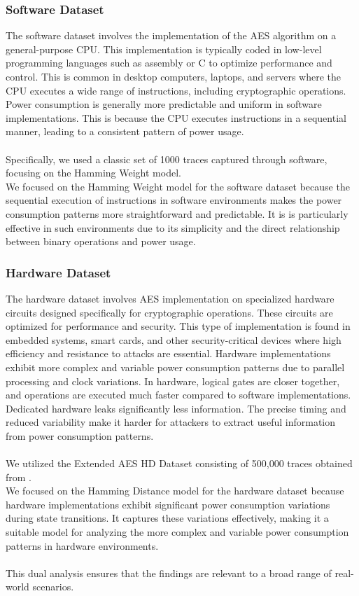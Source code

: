 \documentclass[a4paper,10pt]{article}
\begin{document}
\subsubsection{Software Dataset}
The software dataset involves the implementation of the AES algorithm on a general-purpose CPU.
This implementation is typically coded in low-level programming languages such as assembly or C to optimize performance and control.
This is common in desktop computers, laptops, and servers where the CPU executes a wide range of instructions, including cryptographic operations.
Power consumption is generally more predictable and uniform in software implementations. This is because the CPU executes instructions in a sequential manner, leading to a consistent pattern of power usage.
\\ \\
Specifically, we used a classic set of 1000 traces captured through software, focusing on the Hamming Weight model.\\
We focused on the Hamming Weight model for the software dataset because the sequential execution of instructions in software environments makes the power consumption patterns more straightforward and predictable.
It is is particularly effective in such environments due to its simplicity and the direct relationship between binary operations and power usage.
\subsubsection{Hardware Dataset}
The hardware dataset involves AES implementation on specialized hardware circuits designed specifically for cryptographic operations. 
These circuits are optimized for performance and security.
This type of implementation is found in embedded systems, smart cards, and other security-critical devices where high efficiency and resistance to attacks are essential.
Hardware implementations exhibit more complex and variable power consumption patterns due to parallel processing and clock variations.
In hardware, logical gates are closer together, and operations are executed much faster compared to software implementations.
Dedicated hardware leaks significantly less information. The precise timing and reduced variability make it harder for attackers to extract useful information from power consumption patterns.
\\ \\
We utilized the Extended AES HD Dataset consisting of 500,000 traces obtained from \cite{AES_HD_Ext}.\\
We focused on the Hamming Distance model for the hardware dataset because hardware implementations exhibit significant power consumption variations during state transitions.
It captures these variations effectively, making it a suitable model for analyzing the more complex and variable power consumption patterns in hardware environments. 
\\ \\
This dual analysis ensures that the findings are relevant to a broad range of real-world scenarios.
\end{document}
